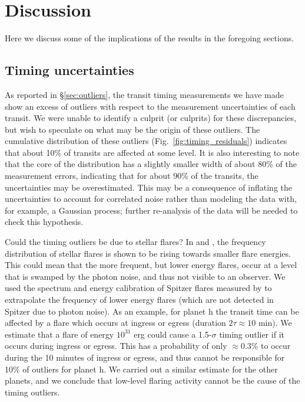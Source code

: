 \documentclass[twocolumn]{aastex63}
\begin{document}
\section{Discussion} \label{sec:discussion}

Here we discuss some of the implications of the results in the foregoing sections.

\subsection{Timing uncertainties}

As reported in \S \ref{sec:outliers}, the transit timing measurements we have made show an excess of outliers with respect to the measurement uncertainties of each transit.  We were unable to identify a culprit (or culprits) for these discrepancies, but wish to speculate on what may be the origin of these outliers.  The cumulative distribution of these outliers (Fig.\ \ref{fig:timing_residuals}) indicates that about 10\% of transits
are affected at some level.  It is also interesting to note that the core of the distribution has a slightly smaller width of about 80\% of the measurement errors, indicating that for about 90\% of the transits, the uncertainties may be overestimated.  This may be a consequence of inflating the uncertainties to account for correlated noise rather than modeling the data with, for example, a Gaussian process;  further re-analysis of the data will be needed to check this hypothesis.

Could the timing outliers be due to stellar flares?  In \citet{Vida_2017} and \citet{Ducrot2020}, the frequency distribution of stellar flares is shown to be rising towards smaller flare energies.  This could mean that the more frequent, but lower energy flares, occur at a level that is swamped by the photon noise, and thus not visible to an observer.  We used the spectrum and energy calibration of Spitzer flares measured by \citet{Ducrot2020} to extrapolate the frequency of lower energy flares (which are not detected in Spitzer due to photon noise).  As an example, for planet h the transit time can be affected by a flare which occurs at ingress or egress (duration $2\tau \approx 10$ min).  %
We estimate that a flare of energy $10^{31}$ erg could cause a 1.5-$\sigma$
timing outlier if it occurs during ingress or egress.  This has a probability of only $\approx 0.3$\% to occur during the 10 minutes of ingress or egress,
and thus cannot be responsible for 10\% of outliers for planet h.  We carried out a similar estimate for
the other planets, and we conclude that low-level flaring activity cannot be the cause of the timing outliers.
\end{document}
